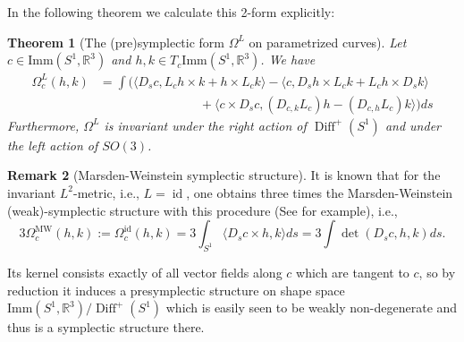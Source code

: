 \documentclass[12pt]{amsart}
\newcommand{\AuthorCOMMENT}[3]{\textcolor{#2}{{[\textbf{#1:} \textsl{#3}}]}}  %
\newcommand{\Sadashige}[1]{\AuthorCOMMENT{Sadashige}{violet}{#1}}
\newcommand{\rev}[1]{#1}
\newtheorem{theorem}{Theorem}[section]
\theoremstyle{definition}
\newtheorem{remark}[theorem]{Remark}
\newcommand{\R}{\mathbb R}
\newcommand{\Diffp}{\operatorname{Diff}^+(S^1)}
\newcommand{\id}{\mathrm{id}}
\newcommand{\Imm}{\mathrm{Imm}}
\def\Om{\Omega}
\def\x{\times}
\def\L{\mathcal{L}}
\def\R{{\mathbb R}}
\begin{document}
 In the following theorem we calculate  this 2-form explicitly:
\begin{theorem}[The (pre)symplectic form $\Omega^L$ on parametrized curves]\label{lem:formula_sympl}
Let $c\in \Imm(S^1,\mathbb R^3)$ and $h,k\in T_c\Imm(S^1,\mathbb R^3)$. We have
\begin{equation}\label{eq:Omega_L}
\begin{aligned}
\Omega^L_c(h,k)&=\int\Big(\langle D_s c, L_c h \x k + h\x L_c k\rangle 
     - \langle c, D_s h \x L_c k + L_ch\x D_s k  \rangle 
    \\&\qquad\qquad\qquad\qquad
     + \langle c\x D_s c, (D_{c,k}L_c)h-(D_{c,h}L_c)k\rangle\Big) ds 
\end{aligned}
\end{equation}
Furthermore, $\Omega^L$ is invariant under the right action of $\Diffp$ and under the left action of $SO(3)$. 
\end{theorem}
\begin{remark}[Marsden-Weinstein symplectic structure]\label{rmk:Marsden-Weinstein}
It is known that for the invariant $L^2$-metric, i.e., $L=\operatorname{id}$,
one obtains three times the Marsden-Weinstein (weak)-symplectic structure with this procedure (See \cite{tabachnikov2017bicycle,Padilla2019bubbleRings} for example), i.e.,
\begin{equation}\label{eq:Marsden-Weinstein form for space curves}
3\Omega^{\operatorname{MW}}_c(h,k):=\Om^\id_c(h,k)= 3 \int_{S^1}\langle D_sc\times h,k\rangle ds = 3 \int\det(D_sc,h,k)ds.
\end{equation}


Its kernel consists exactly of all vector fields along $c$ which are tangent to $c$, so by reduction it induces a presymplectic structure on 
shape space $\Imm(S^1,\mathbb R^3)/\Diffp$ which is easily seen to be weakly non-degenerate and thus is a symplectic structure there. 
\end{remark}
\end{document}
